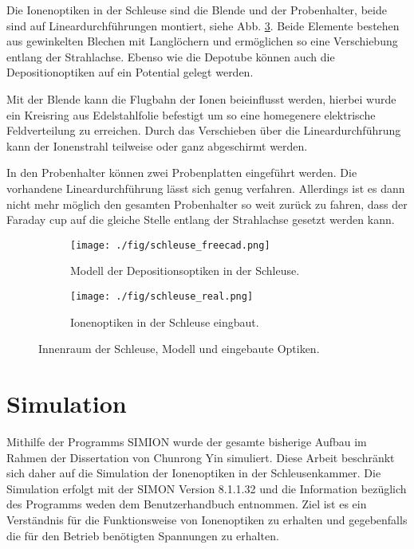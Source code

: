Die Ionenoptiken in der Schleuse sind die Blende und der Probenhalter, beide sind auf Lineardurchführungen montiert, siehe Abb. \ref{fig:schleuse_innen}.
Beide Elemente bestehen aus gewinkelten Blechen mit Langlöchern und ermöglichen so eine Verschiebung entlang der Strahlachse.
Ebenso wie die Depotube können auch die Depositionoptiken auf ein Potential gelegt werden.

Mit der Blende kann die Flugbahn der Ionen beieinflusst werden, hierbei wurde ein Kreisring aus Edelstahlfolie befestigt um so eine homegenere elektrische Feldverteilung zu erreichen.
Durch das Verschieben über die Lineardurchführung kann der Ionenstrahl teilweise oder ganz abgeschirmt werden.

In den Probenhalter können zwei Probenplatten eingeführt werden.
Die vorhandene Lineardurchführung lässt sich genug verfahren.
Allerdings ist es dann nicht mehr möglich den gesamten Probenhalter so weit zurück zu fahren, dass der Faraday cup auf die gleiche Stelle entlang der Strahlachse gesetzt werden kann.
\begin{figure}
    \begin{subfigure}[t]{0.478\textwidth}
      \texttt{[image: ./fig/schleuse\_freecad.png]}
      \caption{Modell der Depositionsoptiken in der Schleuse.}
      \label{fig:schleuse_freecad}
    \end{subfigure}\hfill
    \begin{subfigure}[t]{0.475\textwidth}
      \texttt{[image: ./fig/schleuse\_real.png]}
      \caption{Ionenoptiken in der Schleuse eingbaut.}
      \label{fig:schleuse_real}
    \end{subfigure}
    \caption{Innenraum der Schleuse, Modell und eingebaute Optiken.}
    \label{fig:schleuse_innen}
\end{figure}


\section{Simulation}
Mithilfe der Programms SIMION \cite{Manura.2008} wurde der gesamte bisherige Aufbau im Rahmen der Dissertation von Chunrong Yin \cite{Yin.2007} simuliert.
Diese Arbeit beschränkt sich daher auf die Simulation der Ionenoptiken in der Schleusenkammer.
Die Simulation erfolgt mit der SIMON Version 8.1.1.32 und die Information bezüglich des Programms weden dem Benutzerhandbuch entnommen.
Ziel ist es ein Verständnis für die Funktionsweise von Ionenoptiken zu erhalten und gegebenfalls die für den Betrieb benötigten Spannungen zu erhalten.

